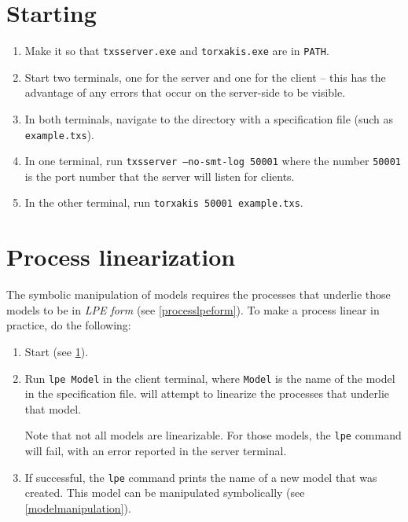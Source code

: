 \section{Starting \txs{}} \label{starttxs}

\begin{enumerate}
\item Make it so that \texttt{txsserver.exe} and \texttt{torxakis.exe} are in \texttt{PATH}.
\item Start two terminals, one for the \txs{} server and one for the \txs{} client -- this has the advantage of any errors that occur on the server-side to be visible.
\item In both terminals, navigate to the directory with a \txs{} specification file (such as \texttt{example.txs}).
\item In one terminal, run \texttt{txsserver --no-smt-log 50001} where the number \texttt{50001} is the port number that the \txs{} server will listen for clients.
\item In the other terminal, run \texttt{torxakis 50001 example.txs}.
\end{enumerate}

\section{Process linearization} \label{processlinearization}

The symbolic manipulation of \txs{} models requires the processes that underlie those models to be in \emph{LPE form} (see \ref{processlpeform}).
To make a \txs{} process linear in practice, do the following:

\begin{enumerate}
\item Start \txs{} (see \ref{starttxs}).
\item Run \texttt{lpe Model} in the client terminal, where \texttt{Model} is the name of the model in the \txs{} specification file.
\txs{} will attempt to linearize the processes that underlie that model.

Note that not all \txs{} models are linearizable.
For those models, the \texttt{lpe} command will fail, with an error reported in the server terminal.
\item If successful, the \texttt{lpe} command prints the name of a new \txs{} model that was created.
This model can be manipulated symbolically (see \ref{modelmanipulation}).
\end{enumerate}

